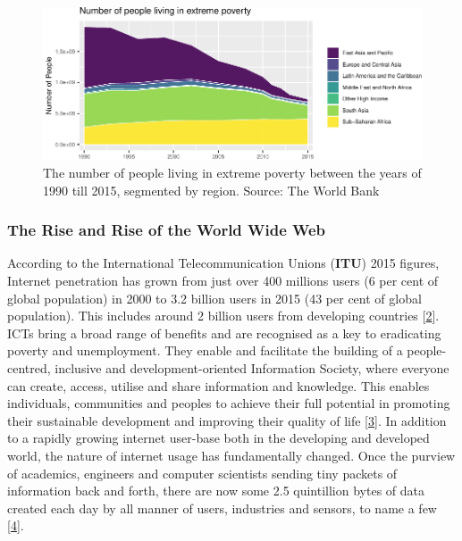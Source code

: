 \documentclass[11pt,]{article}
\begin{document}
\begin{figure}[H]

{\centering \includegraphics{MD_Final_files/figure-latex/globalPovertyPlot-1} 

}

\caption{The number of people living in extreme poverty between the years of 1990 till 2015, segmented by region. Source: The World Bank}\label{fig:globalPovertyPlot}
\end{figure}

\hypertarget{the-rise-and-rise-of-the-world-wide-web}{%
\subsubsection{The Rise and Rise of the World Wide
Web}\label{the-rise-and-rise-of-the-world-wide-web}}

According to the International Telecommunication Unions (\textbf{ITU})
2015 figures, Internet penetration has grown from just over 400 millions
users (6 per cent of global population) in 2000 to 3.2 billion users in
2015 (43 per cent of global population). This includes around 2 billion
users from developing countries
{[}\protect\hyperlink{ref-duttaGlobalInformationTechnology2015}{2}{]}.
ICTs bring a broad range of benefits and are recognised as a key to
eradicating poverty and unemployment. They enable and facilitate the
building of a people-centred, inclusive and development-oriented
Information Society, where everyone can create, access, utilise and
share information and knowledge. This enables individuals, communities
and peoples to achieve their full potential in promoting their
sustainable development and improving their quality of life
{[}\protect\hyperlink{ref-InformationCommunicationTechnologies}{3}{]}.
In addition to a rapidly growing internet user-base both in the
developing and developed world, the nature of internet usage has
fundamentally changed. Once the purview of academics, engineers and
computer scientists sending tiny packets of information back and forth,
there are now some 2.5 quintillion bytes of data created each day by all
manner of users, industries and sensors, to name a few
{[}\protect\hyperlink{ref-DataNeverSleeps}{4}{]}.
\end{document}
